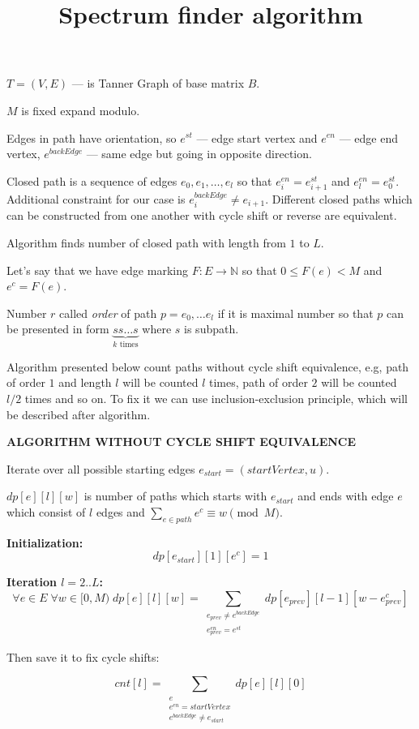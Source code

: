 \documentclass{article}
\title{Spectrum finder algorithm}
\begin{document}
\maketitle

$T = (V, E)$ --- is Tanner Graph of base matrix $B$.

$M$ is fixed expand modulo.

Edges in path have orientation, so $e^{st}$ --- edge start vertex and $e^{en}$ --- edge end vertex,
$e^{backEdge}$ --- same edge but going in opposite direction.

Closed path is a sequence of edges $e_0, e_1, \ldots, e_l$ so that $e^{en}_i = e^{st}_{i + 1}$ and $e^{en}_l = e^{st}_0$. Additional constraint for our case is $e^{backEdge}_i \neq e_{i+1}$. Different closed paths which can be constructed from one another with cycle shift or reverse are equivalent.

Algorithm finds number of closed path with length from $1$ to $L$.

Let's say that we have edge marking $F: E \rightarrow \mathbb{N}$ so that $0 \leq F(e) < M$ and $e^c = F(e)$.

Number $r$ called \textit{order} of path $p = e_0, \ldots e_l$ if it is maximal number so that $p$ can be 
presented in form $\underbrace{ss\ldots s}_{k \text{ times}}$ where $s$ is subpath.

Algorithm presented below count paths without cycle shift equivalence, e.g,
path of order $1$ and length $l$ will be counted $l$ times, path of order $2$ will be counted $l/2$ times
and so on. To fix it we can use inclusion-exclusion principle, which will be described after algorithm.

\textbf{ALGORITHM WITHOUT CYCLE SHIFT EQUIVALENCE}

Iterate over all possible starting edges $e_{start}=(startVertex,u)$.

$dp[e][l][w]$ is number of paths which starts with $e_{start}$ and ends with edge $e$ which consist of $l$ edges and $\sum_{e \in path} e^c \equiv w \pmod{M}$.

\textbf{Initialization:} 
\[
dp[e_{start}][1][e^c] =1
\]

\textbf{Iteration $l = 2..L$:} 
\[
\forall e \in E\; \forall w \in [0, M)\;  dp[e][l][w] = \sum_{\substack{e_{prev} \neq e^{backEdge} \\ e_{prev}^{en} = e^{st}}} dp[e_{prev}][l - 1][w - e_{prev}^c]
\]

Then save it to fix cycle shifts:

\[
cnt[l] = \sum_{\substack{e \\ e^{en} = startVertex \\ e^{backEdge} \neq e_{start}}} dp[e][l][0]
\]
\end{document}
